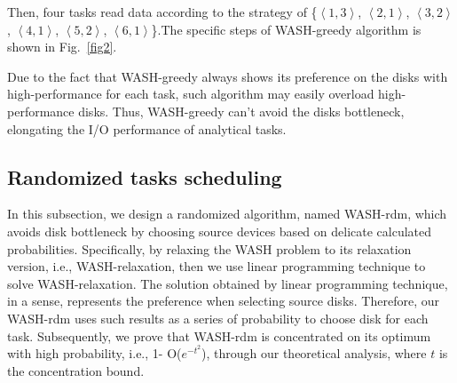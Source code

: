 \documentclass[conference]{IEEEtran}
\begin{document}
Then, four tasks read data according to the strategy of \{$\left \langle 1, 3\right \rangle$, $\left \langle 2, 1\right \rangle$,  $\left \langle 3, 2\right \rangle$, $\left \langle 4, 1\right \rangle$, $\left \langle 5, 2\right \rangle$, $\left \langle 6, 1\right \rangle$\}.The specific steps of WASH-greedy algorithm is shown in Fig.~\ref{fig2}.

Due to the fact that WASH-greedy always shows its preference on the disks with high-performance for each task, such algorithm may easily overload high-performance disks. Thus, WASH-greedy can't avoid the disks bottleneck, elongating the I/O performance of analytical tasks.

\subsection{Randomized tasks scheduling}\label{Randomized}


In this subsection, we design a randomized algorithm, named WASH-rdm, which avoids disk bottleneck by choosing source devices based on delicate calculated probabilities. Specifically, by relaxing the WASH problem to its relaxation version, i.e., WASH-relaxation, then we use linear programming technique to solve WASH-relaxation. The solution obtained by linear programming technique, in a sense, represents the preference when selecting source disks. Therefore, our WASH-rdm uses such results as a series of probability to choose disk for each task. Subsequently, we prove that WASH-rdm is concentrated on its optimum with high probability, i.e., 1- O($e^{-t^2}$), through our theoretical analysis, where $t$ is the concentration bound.
\end{document}
